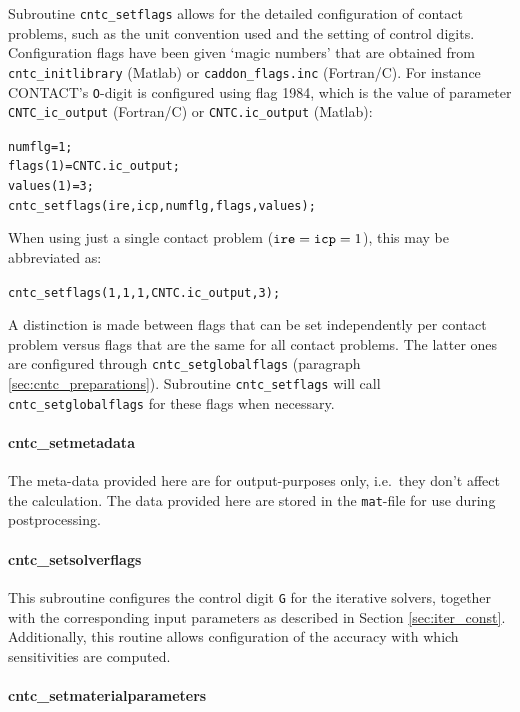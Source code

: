\documentclass[12pt]{report}
\begin{document}
Subroutine {\tt cntc\_setflags} allows for the detailed configuration of
contact problems, such as the unit convention used and the setting of
control digits. Configuration flags have been given `magic numbers' that
are obtained from {\tt cntc\_initlibrary} (Matlab) or {\tt caddon\_flags\-.inc}
(Fortran/C). For instance CONTACT's {\tt O}-digit is configured using flag
1984, which is the value of parameter {\tt CNTC\_ic\_output} (Fortran/C) or
{\tt CNTC.ic\_output} (Matlab):
\begin{alltt}\small
    numflg    = 1;              %
    flags(1)  = CNTC.ic_output;
    values(1) = 3;
    cntc_setflags(ire, icp, numflg, flags, values);
\end{alltt}
When using just a single contact problem (${\tt ire}={\tt icp}=1$), this
may be abbreviated as:
\begin{alltt}\small
    cntc_setflags(1, 1, 1, CNTC.ic_output, 3);
\end{alltt}
A distinction is made between flags that can be set independently per
contact problem versus flags that are the same for all contact problems.
The latter ones are configured through {\tt cntc\_\-set\-glo\-bal\-flags}
(paragraph \ref{sec:cntc_preparations}). Subroutine {\tt cntc\_\-set\-flags}
will call {\tt cntc\_\-set\-glo\-bal\-flags} for these flags when necessary.

\paragraph{cntc\_setmetadata}

The meta-data provided here are for output-purposes only, i.e.\ they don't
affect the calculation. The data provided here are stored in the 
{\tt mat}-file for use during postprocessing.

\paragraph{cntc\_setsolverflags}

This subroutine configures the control digit {\tt G} for the
iterative solvers, together with the corresponding input parameters as
described in Section \ref{sec:iter_const}. Additionally, this routine allows
configuration of the accuracy with which sensitivities are computed.

\paragraph{cntc\_setmaterialparameters}
\end{document}
